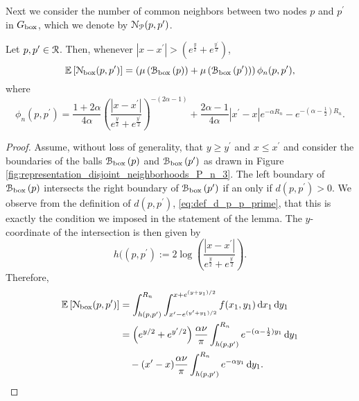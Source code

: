 Next we consider the number of common neighbors between two nodes $p$ and $p^\prime$ in $G_{\text{box}}$, which we denote by ${\mathcal N}_{{\mathcal P}}(p,p^\prime)$. 

\begin{lemma}\label{lem:common_neighbors_Pcal_n}
Let $p, p^\prime \in {\mathcal R}$. Then, whenever $|x - x^\prime| > \left(e^{\frac{y}{2}} + e^{\frac{y^\prime}{2}}\right)$,
\[
	\mathbb{E}\left[{\mathcal N}_{\text{box}}(p,p^\prime)\right] = \left(\mu\left({\mathcal B}_{\text{box}}\left(p\right)\right) + \mu\left({\mathcal B}_{\text{box}}\left(p^\prime\right)\right)\right)\phi_n(p,p^\prime),
\]
where
\[
	\phi_n(p,p^\prime) = \frac{1 + 2\alpha}{4\alpha}\left(\frac{|x - x^\prime|}{e^{\frac{y}{2}} + e^{\frac{y^\prime}{2}}}\right)^{-(2\alpha - 1)} 
	+ \frac{2\alpha - 1}{4\alpha}|x^\prime - x|e^{-\alpha R_n} - e^{-(\alpha - \frac{1}{2})R_n}. 
\]
\end{lemma}

\begin{proof}
Assume, without loss of generality, that $y \ge y^\prime$ and $x \le x^\prime$ and consider the boundaries of the balls ${\mathcal B}_{\text{box}}\left(p\right)$ and ${\mathcal B}_{\text{box}}\left(p^\prime\right)$ as drawn in Figure \ref{fig:representation_disjoint_neighborhoods_P_n_3}. The left boundary of ${\mathcal B}_{\text{box}}\left(p\right)$ intersects the right boundary of ${\mathcal B}_{\text{box}}\left(p^\prime\right)$ if an only if $d(p,p^\prime) > 0$. We observe from the definition of $d(p,p^\prime)$, \eqref{eq:def_d_p_p_prime}, that this is exactly the condition we imposed in the statement of the lemma. The $y$-coordinate of the intersection is then given by
\[
	h((p,p^\prime) := 2\log\left(\frac{|x - x^\prime|}{e^{\frac{y}{2}} + e^{\frac{y^\prime}{2}}}\right).
\]
Therefore,
\begin{align*}
	\mathbb{E}\left[{\mathcal N}_{\text{box}}(p,p^\prime)\right] 
	&= \int_{h(p,p^\prime)}^{R_n} \int_{x^\prime - e^{(y^\prime+y_1)/2}}^{x + e^{(y + y_1)/2}}
		f(x_1,y_1) \operatorname{\mathrm{d}\hspace{-2pt}} x_1 \operatorname{\mathrm{d}\hspace{-2pt}} y_1\\
	&= \left(e^{y/2} + e^{y^\prime/2}\right)\frac{\alpha \nu}{\pi}\int_{h(p,p^\prime)}^{R_n} 
		e^{-(\alpha - \frac{1}{2})y_1} \operatorname{\mathrm{d}\hspace{-2pt}} y_1\\
	&\hspace{10pt}- (x^\prime - x) \frac{\alpha \nu}{\pi} \int_{h(p,p^\prime)}^{R_n} e^{-\alpha y_1} \operatorname{\mathrm{d}\hspace{-2pt}} y_1.
\end{align*}


\end{proof}
